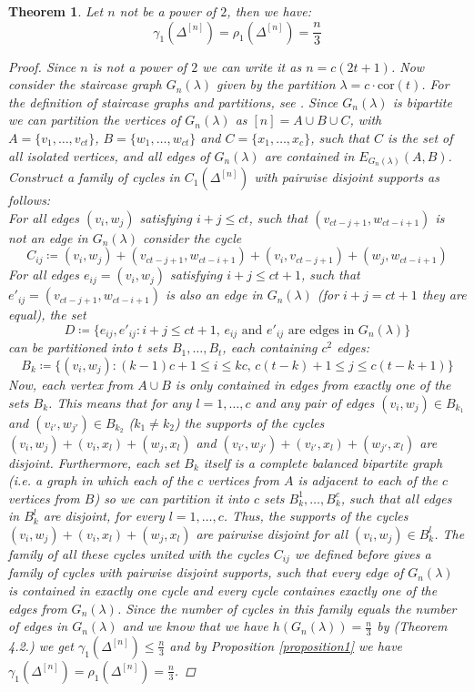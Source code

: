 \documentclass{article}
\newtheorem{thm}{Theorem}[section]
\begin{document}
\begin{thm}\label{theorem1}
Let \(n\) not be a power of \(2\), then we have:
\[
\gamma_1(\Delta^{[n]})=\rho_1(\Delta^{[n]})=\frac{n}{3}
\] 
\begin{proof}
Since \(n\) is not a power of \(2\) we can write it as \(n=c(2t+1)\). Now consider the staircase graph \(G_n(\lambda)\) given by the partition \(\lambda=c\cdot\text{cor}(t)\). For the definition of staircase graphs and partitions, see \cite{2}. Since \(G_n(\lambda)\) is bipartite we can partition the vertices of \(G_n(\lambda)\) as \([n]=A\cup B\cup C\), with \(A=\{v_1,\ldots,v_{ct}\}\), \(B=\{w_1,\ldots,w_{ct}\}\) and \(C=\{x_1,\ldots,x_c\}\), such that \(C\) is the set of all isolated vertices, and all edges of \(G_n(\lambda)\) are contained in \(E_{G_n(\lambda)}(A,B)\). Construct a family of cycles in \(C_1(\Delta^{[n]})\) with pairwise disjoint supports as follows:\\
For all edges \((v_i,w_j)\) satisfying \(i+j\leq ct\), such that \((v_{ct-j+1},w_{ct-i+1})\) is not an edge in \(G_n(\lambda)\) consider the cycle
\[
C_{ij}\coloneqq (v_i,w_j)+(v_{ct-j+1},w_{ct-i+1})+(v_i,v_{ct-j+1})+(w_j,w_{ct-i+1})
\]
For all edges \(e_{ij}=(v_i,w_j)\) satisfying \(i+j\leq ct+1\), such that \(e'_{ij}=(v_{ct-j+1},w_{ct-i+1})\) is also an edge in \(G_n(\lambda)\) (for \(i+j=ct+1\) they are equal), the set
\[
D\coloneqq\{e_{ij}, e'_{ij}:i+j\leq ct+1\text{, }e_{ij}\text{ and }e'_{ij}\text{ are edges in }G_n(\lambda)\}
\] can be partitioned into \(t\) sets \(B_1,\ldots,B_t\), each containing \(c^2\) edges:
\[
B_k\coloneqq\{(v_i,w_j):(k-1)c+1\leq i\leq kc\text{, }c(t-k)+1\leq j\leq c(t-k+1)\}
\]
Now, each vertex from \(A\cup B\) is only contained in edges from exactly one of the sets \(B_k\). This means that for any \(l=1,\ldots,c\) and any pair of edges \((v_i,w_j)\in B_{k_1}\) and \((v_{i'},w_{j'})\in B_{k_2}\) (\(k_1\neq k_2\)) the supports of the cycles \((v_i,w_j)+(v_i,x_l)+(w_j,x_l)\) and \((v_{i'},w_{j'})+(v_{i'},x_l)+(w_{j'},x_l)\) are disjoint. Furthermore, each set \(B_k\) itself is a complete balanced bipartite graph (i.e. a graph in which each of the \(c\) vertices from \(A\) is adjacent to each of the \(c\) vertices from \(B\)) so we can partition it into \(c\) sets \(B_k^1,\ldots,B_k^c\), such that all edges in \(B_k^l\) are disjoint, for every \(l=1,\ldots,c\). Thus, the supports of the cycles \((v_i,w_j)+(v_i,x_l)+(w_j,x_l)\) are pairwise disjoint for all \((v_i,w_j)\in B_k^l\). The family of all these cycles united with the cycles \(C_{ij}\) we defined before gives a family of cycles with pairwise disjoint supports, such that every edge of \(G_n(\lambda)\) is contained in exactly one cycle and every cycle containes exactly one of the edges from \(G_n(\lambda)\). Since the number of cycles in this family equals the number of edges in \(G_n(\lambda)\) and we know that we have \(h(G_n(\lambda))=\frac{n}{3}\) by \cite{2} (Theorem 4.2.) we get \(\gamma_1(\Delta^{[n]})\leq\frac{n}{3}\) and by Proposition \ref{proposition1} we have \(\gamma_1(\Delta^{[n]})=\rho_1(\Delta^{[n]})=\frac{n}{3}\).
\end{proof}
\end{thm}
\end{document}
